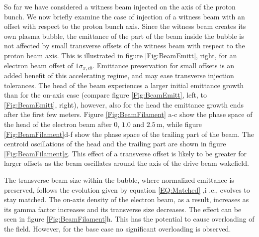 \documentclass[aps,prstab,reprint,amsmath,amssymb,groupedaddress]{revtex4-1}
\newcommand{\unit}[1]{\,\mathrm{#1}}
\begin{document}
So far we have considered a witness beam injected on the axis of the proton bunch. We now briefly examine the case of
injection of a witness beam with an offset with respect to the proton bunch axis. Since the witness beam creates its own
plasma bubble, the emittance of the part of the beam inside the bubble is not affected by small transverse offsets of
the witness beam with respect to the proton beam axis. This is illustrated in figure \ref{Fig:BeamEmitt}, right, for an
electron beam offset of $1\sigma_{x,eb}$. Emittance preservation for small offsets is an added benefit of this
accelerating regime, and may ease transverse injection tolerances.  The head of the beam experiences a 
larger initial emittance growth than for the on-axis case (compare figure \ref{Fig:BeamEmitt}, left, to
\ref{Fig:BeamEmitt}, right), however, also for the head the emittance growth ends after the first few meters.
Figure \ref{Fig:BeamFilament} a-c show the phase space of the head of the electron beam after $0$, $1.0$ and
$2.5\unit{m}$, while figure \ref{Fig:BeamFilament}d-f show the phase space of the trailing part of the beam. The
centroid oscillations of the head and the trailing part are shown in figure \ref{Fig:BeamFilament}g. This effect of a
transverse offset is likely to be greater for larger offsets as the beam oscillates around the axis of the drive beam
wakefield.

The transverse beam size within the bubble, where normalized emittance is preserved, follows the evolution given by
equation \ref{EQ:Matched} %
,i .e., evolves to stay matched. The on-axis density of the electron beam, as a result, increases as its gamma factor
increases and its transverse size decreases. The effect can be seen in figure \ref{Fig:BeamFilament}h. This has the
potential to cause overloading of the field. However, for the base case no significant overloading %
is observed.  
\end{document}
